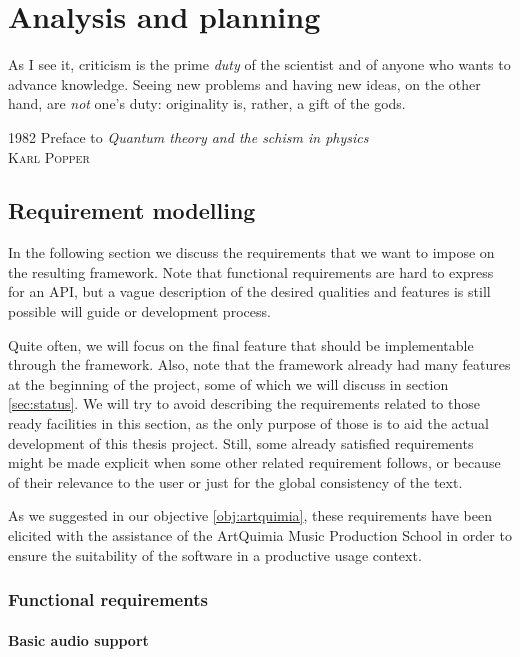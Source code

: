 
\chapter{Analysis and planning}

\epigraph{As I see it, criticism is the prime \emph{duty} of the
  scientist and of anyone who wants to advance knowledge. Seeing new
  problems and having new ideas, on the other hand, are \emph{not}
  one's duty: originality is, rather, a gift of the gods.}{
  1982 Preface to \emph{Quantum theory and the schism in physics}\\
  \textsc{Karl Popper}}

\section{Requirement modelling}

In the following section we discuss the requirements that we want to
impose on the resulting framework. Note that functional requirements
are hard to express for an API, but a vague description of the desired
qualities and features is still possible will guide or development
process.

Quite often, we will focus on the final feature that should be
implementable through the framework. Also, note that the framework
already had many features at the beginning of the project, some of
which we will discuss in section \ref{sec:status}. We will try to
avoid describing the requirements related to those ready facilities in
this section, as the only purpose of those is to aid the actual
development of this thesis project. Still, some already satisfied
requirements might be made explicit when some other related
requirement follows, or because of their relevance to the user or just
for the global consistency of the text.

As we suggested in our objective \ref{obj:artquimia}, these
requirements have been elicited with the assistance of the ArtQuimia
Music Production School in order to ensure the suitability of the
software in a productive usage context.

\subsection{Functional requirements}

\subsubsection{Basic audio support}

